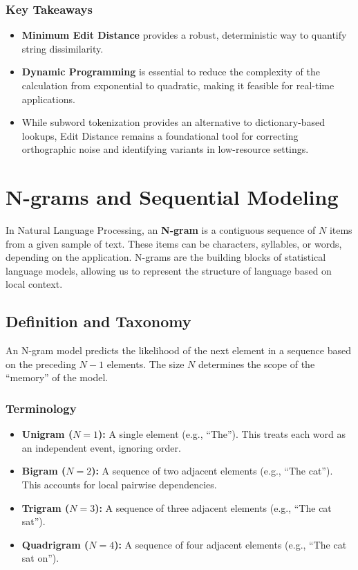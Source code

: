 \documentclass[
  italian,
  11pt,
]{article}
\providecommand{\tightlist}{%
  \setlength{\itemsep}{0pt}\setlength{\parskip}{0pt}}
\begin{document}
\subsubsection{Key Takeaways}\label{key-takeaways-4}

\begin{itemize}
\tightlist
\item
  \textbf{Minimum Edit Distance} provides a robust, deterministic way to
  quantify string dissimilarity.
\item
  \textbf{Dynamic Programming} is essential to reduce the complexity of
  the calculation from exponential to quadratic, making it feasible for
  real-time applications.
\item
  While subword tokenization provides an alternative to dictionary-based
  lookups, Edit Distance remains a foundational tool for correcting
  orthographic noise and identifying variants in low-resource settings.
\end{itemize}

\newpage

\section{N-grams and Sequential
Modeling}\label{n-grams-and-sequential-modeling}

In Natural Language Processing, an \textbf{N-gram} is a contiguous
sequence of \(N\) items from a given sample of text. These items can be
characters, syllables, or words, depending on the application. N-grams
are the building blocks of statistical language models, allowing us to
represent the structure of language based on local context.

\subsection{Definition and Taxonomy}\label{definition-and-taxonomy}

An N-gram model predicts the likelihood of the next element in a
sequence based on the preceding \(N-1\) elements. The size \(N\)
determines the scope of the ``memory'' of the model.

\subsubsection{Terminology}\label{terminology}

\begin{itemize}
\tightlist
\item
  \textbf{Unigram (\(N=1\)):} A single element (e.g., ``The''). This
  treats each word as an independent event, ignoring order.
\item
  \textbf{Bigram (\(N=2\)):} A sequence of two adjacent elements (e.g.,
  ``The cat''). This accounts for local pairwise dependencies.
\item
  \textbf{Trigram (\(N=3\)):} A sequence of three adjacent elements
  (e.g., ``The cat sat'').
\item
  \textbf{Quadrigram (\(N=4\)):} A sequence of four adjacent elements
  (e.g., ``The cat sat on'').
\end{itemize}
\end{document}
